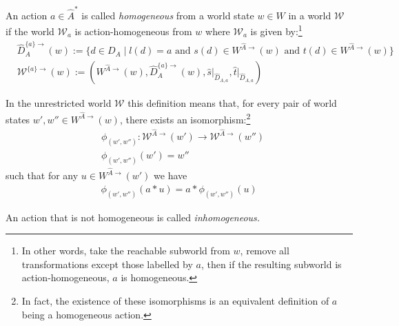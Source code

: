 

\begin{definition}
    An action $a \in \hat{A}^{*}$ is called \emph{homogeneous} from a world state $w \in W$ in a world $\mathscr{W}$ if the world $\mathscr{W}_{a}$ is action-homogeneous from $w$ where $\mathscr{W}_{a}$ is given by:\footnote{
    In other words, take the reachable subworld from $w$, remove all transformations except those labelled by $a$, then if the resulting subworld is action-homogeneous, $a$ is homogeneous.
    }
    \begin{align}
        & \hat{D}_{A}^{\{a\}\to}(w) := \{ d \in D_{A} \mid l(d)=a \text{ and } s(d) \in W^{\hat{A}\to}(w) \text{ and } t(d) \in W^{\hat{A}\to}(w)\} \\
        & \mathscr{W}^{\{a\}\to}(w) := (W^{\hat{A}\to}(w), \hat{D}_{A}^{\{a\}\to}(w), \hat{s}\big|_{\hat{D}_{A, a}}, \hat{t}\big|_{\hat{D}_{A, a}})
    \end{align}
\end{definition}
In the unrestricted world $\mathscr{W}$ this definition means that, for every pair of world states $w', w'' \in W^{\hat{A}\to}(w)$, there exists an isomorphism:\footnote{
In fact, the existence of these isomorphisms is an equivalent definition of $a$ being a homogeneous action.
}
\begin{align}
    & \phi_{(w', w'')}: \mathscr{W}^{\hat{A}\to}(w') \to \mathscr{W}^{\hat{A}\to}(w'') \\
    & \phi_{(w', w'')}(w') = w''
\end{align}
such that for any $u \in W^{\hat{A}\to}(w')$ we have
\begin{align}
    \phi_{(w', w'')}(a \ast u) = a \ast \phi_{(w', w'')}(u)
\end{align}

An action that is not homogeneous is called \emph{inhomogeneous.}

